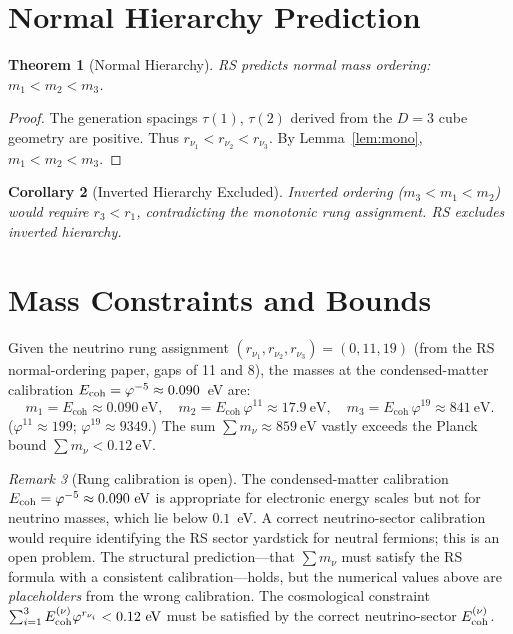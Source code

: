 \documentclass[12pt,a4paper]{article}
\newtheorem{theorem}{Theorem}[section]
\newtheorem{corollary}[theorem]{Corollary}
\theoremstyle{definition}
\theoremstyle{remark}
\newtheorem{remark}[theorem]{Remark}
\begin{document}
\section{Normal Hierarchy Prediction}
\label{sec:hierarchy}

\begin{theorem}[Normal Hierarchy]
\label{thm:normal}
RS predicts normal mass ordering: $m_1 < m_2 < m_3$.
\end{theorem}

\begin{proof}
The generation spacings $\tau(1)$, $\tau(2)$ derived from the
$D = 3$ cube geometry are positive.  Thus $r_{\nu_1} < r_{\nu_2} <
r_{\nu_3}$.  By Lemma~\ref{lem:mono}, $m_1 < m_2 < m_3$.
\end{proof}

\begin{corollary}[Inverted Hierarchy Excluded]
Inverted ordering ($m_3 < m_1 < m_2$) would require $r_3 < r_1$,
contradicting the monotonic rung assignment.  RS excludes inverted
hierarchy.
\end{corollary}

\section{Mass Constraints and Bounds}
\label{sec:bounds}

Given the neutrino rung assignment $(r_{\nu_1}, r_{\nu_2}, r_{\nu_3})
= (0, 11, 19)$ (from the RS normal-ordering paper, gaps of 11 and 8),
the masses at the condensed-matter calibration $E_{\rm coh}=\varphi^{-5}
\approx 0.090$~eV are:
\begin{equation}
  m_1 = E_{\mathrm{coh}} \approx 0.090~\mathrm{eV}, \quad
  m_2 = E_{\mathrm{coh}}\,\varphi^{11} \approx 17.9~\mathrm{eV}, \quad
  m_3 = E_{\mathrm{coh}}\,\varphi^{19} \approx 841~\mathrm{eV}.
\end{equation}
($\varphi^{11} \approx 199$; $\varphi^{19} \approx 9349$.)
The sum $\sum m_\nu \approx 859~\mathrm{eV}$ vastly exceeds the
Planck bound $\sum m_\nu < 0.12~\mathrm{eV}$.

\begin{remark}[Rung calibration is open]
\label{rem:calibration}
The condensed-matter calibration $E_{\rm coh}=\varphi^{-5}\approx
0.090~\mathrm{eV}$ is appropriate for electronic energy scales but
not for neutrino masses, which lie below $0.1$~eV.  A correct
neutrino-sector calibration would require identifying the RS
sector yardstick for neutral fermions; this is an open problem.
The structural prediction---that $\sum m_\nu$ must satisfy the RS
formula with a consistent calibration---holds, but the numerical
values above are \emph{placeholders} from the wrong calibration.
The cosmological constraint
$\sum_{i=1}^{3} E_{\rm coh}^{(\nu)} \varphi^{r_{\nu_i}} < 0.12~\mathrm{eV}$
must be satisfied by the correct neutrino-sector $E_{\rm coh}^{(\nu)}$.
\end{remark}
\end{document}

